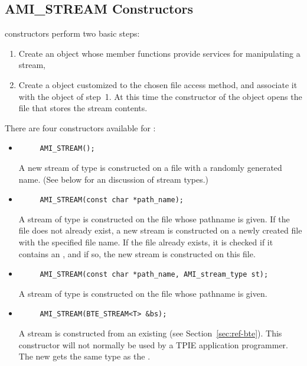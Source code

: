 \subsection{AMI\_STREAM Constructors}
\label{member:ami-constructor}

 constructors perform two basic
steps:
\begin{enumerate}
    \item Create an  object whose member
    functions provide services for manipulating a
    stream,
    \item Create a  object customized to
    the chosen file access method, and associate it with the
     object of step~1. At this time the
    constructor of the  object opens the
    file that stores the stream contents.
\end{enumerate}

\noindent
There are four constructors available for :

\begin{itemize}
\item
\begin{verbatim}
     AMI_STREAM();
\end{verbatim}
A new stream of type  is
constructed on a file with a randomly generated name. (See
below for an discussion of stream types.)

\item
\begin{verbatim}
     AMI_STREAM(const char *path_name);
\end{verbatim}
A stream of type  is constructed on the file whose pathname is given.
If the file does not already exist, a new stream is
constructed on a newly created file with the specified file
name. If the file already exists, it
is checked if it contains an , and if so,
the new stream is constructed on this file.

\item
\begin{verbatim}
     AMI_STREAM(const char *path_name, AMI_stream_type st);
\end{verbatim}
A stream of type  is constructed on the file whose
pathname is given.

\item
\begin{verbatim}
     AMI_STREAM(BTE_STREAM<T> &bs);
\end{verbatim}
A stream is constructed from an existing
 (see Section~\ref{sec:ref-bte}). This
constructor will not normally be used by a TPIE application
programmer. The new  gets the same
type as the .
\end{itemize}

